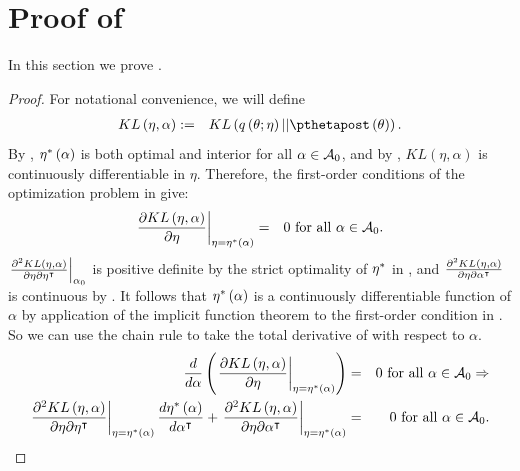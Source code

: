 \documentclass{article}\usepackage[]{graphicx}\usepackage[]{color}
\theoremstyle{definition}
\theoremstyle{plain}
\theoremstyle{plain}
\theoremstyle{plain}
\theoremstyle{definition}
\theoremstyle{plain}
\theoremstyle{plain}
\begin{document}
\section{\label{app:lrvb}Proof of }

In this section we prove .
\begin{proof}
For notational convenience, we will define
\begin{eqnarray*}
KL\left(\eta,\alpha\right) & := &
    KL\left(q\left(\theta;\eta\right)||\pthetapost\left(\theta\right)\right).
\end{eqnarray*}
By , $\eta^{*}\left(\alpha\right)$ is both optimal and interior
for all $\alpha\in\mathcal{A}_{0}$, and by ,
$KL\left(\eta,\alpha\right)$ is continuously differentiable in $\eta$. Therefore, the
first-order conditions of the optimization problem in  give:
\begin{eqnarray}
\left.\frac{\partial KL\left(\eta,\alpha\right)}{\partial\eta}\right|_{\eta=\eta^{*}\left(\alpha\right)}
    & = & 0\textrm{ for all }\alpha\in\mathcal{A}_{0}.
    \label{eq:kl_first_order_condition}
\end{eqnarray}
$\left.\frac{\partial^{2}KL\left(\eta,\alpha\right)}{\partial\eta\partial\eta^{\intercal}}\right|_{\alpha_{0}}$
is positive definite by the strict optimality of $\eta^{*}$ in
, and
$\frac{\partial^{2}KL\left(\eta,\alpha\right)}{\partial\eta\partial\alpha^{\intercal}}$
is continuous by . It follows that $\eta^{*}\left(\alpha\right)$ is a
continuously differentiable function of $\alpha$ by application of the implicit
function theorem to the first-order condition in
 \citep[Chapter
4.6]{fleming:1965:functions}. So we can use the chain rule to take the total
derivative of  with respect to
$\alpha$.
\begin{eqnarray*}
\frac{d}{d\alpha}\left(\left.
    \frac{\partial KL\left(\eta,\alpha\right)}{\partial\eta}
    \right|_{\eta=\etatopt}\right) & = &
    0\textrm{ for all }\alpha\in\alphazeroball\Rightarrow\\
\left.\frac{\partial^{2}KL\left(\eta,\alpha\right)}
    {\partial\eta\partial\eta^{\trans}}\right|_{\eta=\etatopt}
    \frac{d\etatopt}{d\alpha^{\trans}}+\left.
    \frac{\partial^{2}KL\left(\eta,\alpha\right)}
        {\partial\eta\partial\alpha^{\trans}}\right|_{\eta=\etatopt} & = &
        0\textrm{ for all }\alpha\in\alphazeroball.

\end{eqnarray*}
\end{proof}
\end{document}
